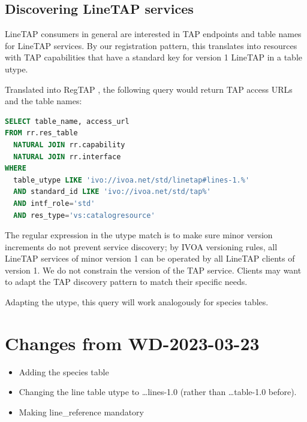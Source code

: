 \documentclass[11pt,a4paper]{ivoa}
\begin{document}
\subsection{Discovering LineTAP services}

LineTAP consumers in general are interested in TAP endpoints and table names for
LineTAP services.  By our registration pattern, this translates into
resources with TAP capabilities that have a standard key for version 1
LineTAP in a table utype.

Translated into RegTAP \citep{2019ivoa.spec.1011D}, the following query
would return TAP access URLs and the table names:

\begin{lstlisting}[language=SQL]
SELECT table_name, access_url
FROM rr.res_table
  NATURAL JOIN rr.capability
  NATURAL JOIN rr.interface
WHERE
  table_utype LIKE 'ivo://ivoa.net/std/linetap#lines-1.%'
  AND standard_id LIKE 'ivo://ivoa.net/std/tap%'
  AND intf_role='std'
  AND res_type='vs:catalogresource'
\end{lstlisting}

The regular expression in the utype match is to make sure minor version
increments do not prevent service discovery; by IVOA versioning rules,
all LineTAP services of minor version 1 can be operated by all LineTAP
clients of version 1.  We do not constrain the version of the TAP
service. Clients may want to adapt the TAP discovery pattern to match
their specific needs.

Adapting the utype, this query will work analogously for species tables.

\appendix
\section{Changes from WD-2023-03-23}

\begin{itemize}
\item Adding the species table
\item Changing the line table utype to \dots lines-1.0 (rather than
\dots table-1.0 before).
\item Making line\_reference mandatory
\end{itemize}



\end{document}
